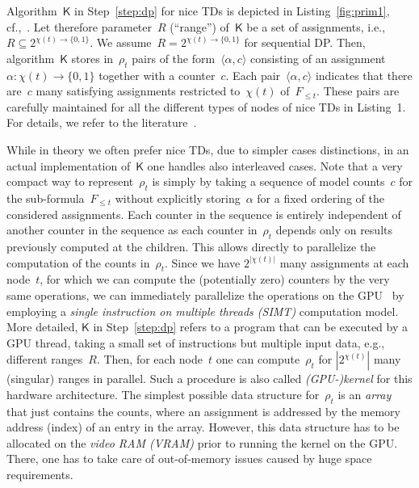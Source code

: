 \documentclass{llncs}
\newcommand{\Card}[1]{|#1|}
\newcommand{\algo}[1]{\ensuremath{\mathsf{#1}}}
\begin{document}
\noindent Algorithm~$\algo{K}$ in Step~\ref{step:dp} for nice TDs is depicted in Listing~\ref{fig:prim1}, cf.,~\cite{FichteEtAl18c,SamerSzeider10b}. Let therefore parameter~$R$ (``range'') of~\algo{K}
be a set of assignments, i.e., $R\subseteq 2^{\chi(t) \rightarrow \{0,1\}}$.
We assume~$R=2^{\chi(t) \rightarrow \{0,1\}}$ for sequential DP.
Then, algorithm~\algo{K} stores in~$\rho_t$ pairs of the form~$\langle\alpha,c\rangle$
consisting of an assignment~$\alpha: \chi(t) \rightarrow \{0,1\}$ together with a counter~$c$. %
Each pair~$\langle \alpha, c\rangle$ indicates that there are~$c$ many satisfying assignments restricted to~${\chi(t)}$ of~$F_{\leq t}$.
These pairs are carefully maintained for all the different types of nodes of nice TDs in Listing~1.
%
For details, we refer to the
literature~\cite{FichteEtAl18c,SamerSzeider10b}.
%
%

While in theory we often prefer nice TDs, due to simpler cases
distinctions, in an actual implementation of~\algo{K} one handles also
interleaved cases.  Note that a very compact way to represent~$\rho_t$
is simply by taking a sequence of model counts~$c$ for the
sub-formula~$F_{\leq t}$ without explicitly storing~$\alpha$ for a
fixed ordering of the considered assignments.
%
Each counter in the sequence is entirely independent of another
counter in the sequence as each counter in~$\rho_t$ depends only on
results previously computed at the children. This allows directly to
parallelize the computation of the counts in~$\rho_t$.
%
%
Since we have $2^{\Card{\chi(t)}}$ many assignments at each node~$t$, for
which we can compute the (potentially zero) counters by the very same
operations, we can immediately parallelize the operations on the
GPU~\cite{FichteEtAl18c} by employing a \emph{single instruction on
  multiple threads (SIMT)} computation model.
%
More detailed, $\algo{K}$ in Step~\ref{step:dp} refers
to a program that can be executed by a GPU thread, taking a small set
of instructions but multiple input data, e.g., different ranges~$R$.
Then, for each node~$t$ one can compute~$\rho_t$
for $\Card{2^{\chi(t)}}$ many (singular) ranges in parallel. 
Such a procedure is also
called \emph{(GPU-)kernel} for this hardware architecture.
%
The simplest possible data structure for~$\rho_t$ is an \emph{array} that just
contains the counts, where an assignment is addressed by the memory
address (index) of an entry in the array.
%
However, this data structure has to be allocated on the \emph{video
  RAM (VRAM)} prior to running the kernel on the GPU.
There, one has to take care of %
%
out-of-memory issues caused by huge space requirements.
%
\end{document}
